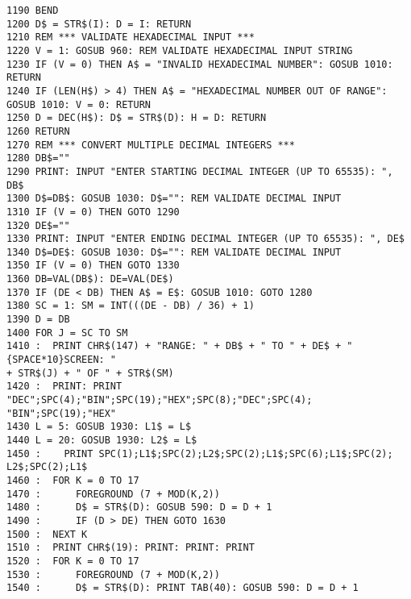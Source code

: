 \begin{tcolorbox}[colback=black,coltext=white]
\verbatimfont{\codefont}
\begin{verbatim}
1190 BEND
1200 D$ = STR$(I): D = I: RETURN
1210 REM *** VALIDATE HEXADECIMAL INPUT ***
1220 V = 1: GOSUB 960: REM VALIDATE HEXADECIMAL INPUT STRING
1230 IF (V = 0) THEN A$ = "INVALID HEXADECIMAL NUMBER": GOSUB 1010: RETURN
1240 IF (LEN(H$) > 4) THEN A$ = "HEXADECIMAL NUMBER OUT OF RANGE":
GOSUB 1010: V = 0: RETURN
1250 D = DEC(H$): D$ = STR$(D): H = D: RETURN
1260 RETURN
1270 REM *** CONVERT MULTIPLE DECIMAL INTEGERS ***
1280 DB$=""
1290 PRINT: INPUT "ENTER STARTING DECIMAL INTEGER (UP TO 65535): ", DB$
1300 D$=DB$: GOSUB 1030: D$="": REM VALIDATE DECIMAL INPUT
1310 IF (V = 0) THEN GOTO 1290
1320 DE$=""
1330 PRINT: INPUT "ENTER ENDING DECIMAL INTEGER (UP TO 65535): ", DE$
1340 D$=DE$: GOSUB 1030: D$="": REM VALIDATE DECIMAL INPUT
1350 IF (V = 0) THEN GOTO 1330
1360 DB=VAL(DB$): DE=VAL(DE$)
1370 IF (DE < DB) THEN A$ = E$: GOSUB 1010: GOTO 1280
1380 SC = 1: SM = INT(((DE - DB) / 36) + 1)
1390 D = DB
1400 FOR J = SC TO SM
1410 :  PRINT CHR$(147) + "RANGE: " + DB$ + " TO " + DE$ + "{SPACE*10}SCREEN: "
+ STR$(J) + " OF " + STR$(SM)
1420 :  PRINT: PRINT "DEC";SPC(4);"BIN";SPC(19);"HEX";SPC(8);"DEC";SPC(4);
"BIN";SPC(19);"HEX"
1430 L = 5: GOSUB 1930: L1$ = L$
1440 L = 20: GOSUB 1930: L2$ = L$
1450 :    PRINT SPC(1);L1$;SPC(2);L2$;SPC(2);L1$;SPC(6);L1$;SPC(2);
L2$;SPC(2);L1$
1460 :  FOR K = 0 TO 17
1470 :      FOREGROUND (7 + MOD(K,2))
1480 :      D$ = STR$(D): GOSUB 590: D = D + 1
1490 :      IF (D > DE) THEN GOTO 1630
1500 :  NEXT K
1510 :  PRINT CHR$(19): PRINT: PRINT: PRINT
1520 :  FOR K = 0 TO 17
1530 :      FOREGROUND (7 + MOD(K,2))
1540 :      D$ = STR$(D): PRINT TAB(40): GOSUB 590: D = D + 1

\end{verbatim}
\end{tcolorbox}
